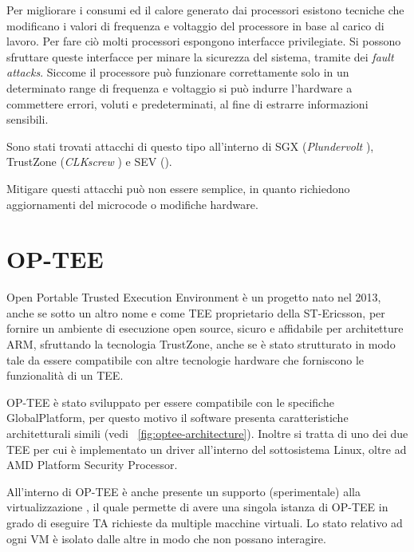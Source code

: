 \documentclass[12pt,italian]{report}
\begin{document}
	\bigbreak
	
	Per migliorare i consumi ed il calore generato dai processori esistono tecniche che modificano i valori di frequenza e voltaggio del processore in base al carico di lavoro. Per fare ciò molti processori espongono interfacce privilegiate. Si possono sfruttare queste interfacce per minare la sicurezza del sistema, tramite dei \textit{fault attacks}. Siccome il processore può funzionare correttamente solo in un determinato range di frequenza e voltaggio si può indurre l'hardware a commettere errori, voluti e predeterminati, al fine di estrarre informazioni sensibili.
	
	Sono stati trovati attacchi di questo tipo all'interno di SGX (\textit{Plundervolt} \cite{plundervolt}), TrustZone (\textit{CLKscrew} \cite{clkscrew}) e SEV (\cite{sev_power_attack}).
	
	Mitigare questi attacchi può non essere semplice, in quanto richiedono aggiornamenti del microcode o modifiche hardware.
	
	\newpage

	\section{OP-TEE}
	\label{sec:optee}
	Open Portable Trusted Execution Environment \cite{optee} è un progetto nato nel 2013, anche se sotto un altro nome e come TEE proprietario della ST-Ericsson, per fornire un ambiente di esecuzione open source, sicuro e affidabile per architetture ARM, sfruttando la tecnologia TrustZone, anche se è stato strutturato in modo tale da essere compatibile con altre tecnologie hardware che forniscono le funzionalità di un TEE.

	OP-TEE è stato sviluppato per essere compatibile con le specifiche GlobalPlatform, per questo motivo il software presenta caratteristiche architetturali simili (vedi \figurename~\ref{fig:optee-architecture}). Inoltre si tratta di uno dei due TEE per cui è implementato un driver all'interno del sottosistema Linux, oltre ad AMD Platform Security Processor.
	
	\bigbreak 
	
	All'interno di OP-TEE è anche presente un supporto (sperimentale) alla virtualizzazione \cite{optee_virtualization}, il quale permette di avere una singola istanza di OP-TEE in grado di eseguire TA richieste da multiple macchine virtuali. Lo stato relativo ad ogni VM è isolato dalle altre in modo che non possano interagire.
	
	\bigbreak
	
\end{document}
